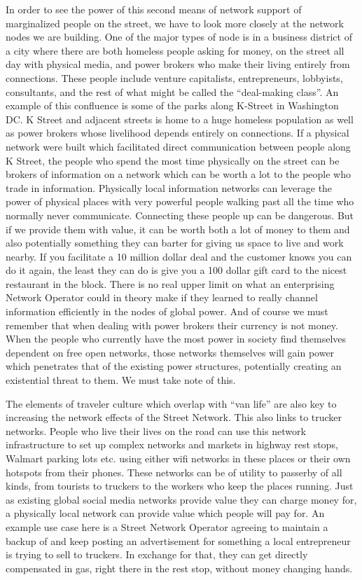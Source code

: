 In order to see the power of this second means of network support of marginalized people on the street, we have to look more closely at the network nodes we are building.  One of the major types of node is in a business district of a city where there are both homeless people asking for money, on the street all day with physical media, and power brokers who make their living entirely from connections.  These people include venture capitalists, entrepreneurs, lobbyists, consultants, and the rest of what might be called the ``deal-making class''.  An example of this confluence is some of the parks along K-Street in Washington DC.  K Street and adjacent streets is home to a huge homeless population as well as power brokers whose livelihood depends entirely on connections.  If a physical network were built which facilitated direct communication between people along K Street, the people who spend the most time physically on the street can be brokers of information on a network which can be worth a lot to the people who trade in information.  Physically local information networks can leverage the power of physical places with very powerful people walking past all the time who normally never communicate.  Connecting these people up can be dangerous.  But if we provide them with value, it can be worth both a lot of money to them and also potentially something they can barter for giving us space to live and work nearby.  If you facilitate a 10 million dollar deal and the customer knows you can do it again, the least they can do is give you a 100 dollar gift card to the nicest restaurant in the block.  There is no real upper limit on what an enterprising Network Operator could in theory make if they learned to really channel information efficiently in the nodes of global power.  And of course we must remember that when dealing with power brokers their currency is not money.  When the people who currently have the most power in society find themselves dependent on free open networks, those networks themselves will gain power which penetrates that of the existing power structures, potentially creating an existential threat to them.  We must take note of this.

The elements of traveler culture which overlap with ``van life'' are also key to increasing the network effects of the Street Network.  This also links to trucker networks.  People who live their lives on the road can use this network infrastructure to set up complex networks and markets in highway rest stops, Walmart parking lots etc. using either wifi networks in these places or their own hotspots from their phones.  These networks can be of utility to passerby of all kinds, from tourists to truckers to the workers who keep the places running.  Just as existing global social media networks provide value they can charge money for, a physically local network can provide value which people will pay for.  An example use case here is a Street Network Operator agreeing to maintain a backup of and keep posting an advertisement for something a local entrepreneur is trying to sell to truckers.  In exchange for that, they can get directly compensated in gas, right there in the rest stop, without money changing hands.  

